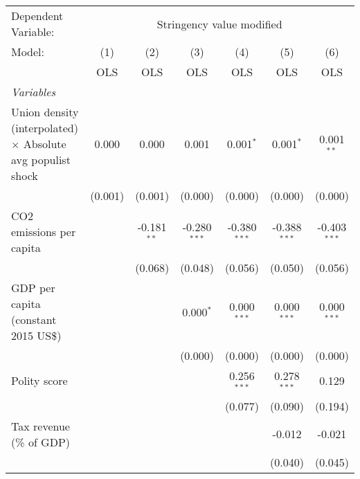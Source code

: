 
\begingroup
\centering
\begin{tabular}{lcccccc}
   \toprule
   Dependent Variable: & \multicolumn{6}{c}{Stringency value modified}\\
   Model:                                                             & (1)     & (2)           & (3)            & (4)            & (5)            & (6)\\  
                                                                      &  OLS    & OLS           & OLS            & OLS            & OLS            & OLS\\  
   \midrule
   \emph{Variables}\\
   Union density (interpolated) $\times$ Absolute avg populist shock  & 0.000   & 0.000         & 0.001          & 0.001$^{*}$    & 0.001$^{*}$    & 0.001$^{**}$\\   
                                                                      & (0.001) & (0.001)       & (0.000)        & (0.000)        & (0.000)        & (0.000)\\   
   CO2 emissions per capita                                           &         & -0.181$^{**}$ & -0.280$^{***}$ & -0.380$^{***}$ & -0.388$^{***}$ & -0.403$^{***}$\\   
                                                                      &         & (0.068)       & (0.048)        & (0.056)        & (0.050)        & (0.056)\\   
   GDP per capita (constant 2015 US\$)                                &         &               & 0.000$^{*}$    & 0.000$^{***}$  & 0.000$^{***}$  & 0.000$^{***}$\\   
                                                                      &         &               & (0.000)        & (0.000)        & (0.000)        & (0.000)\\   
   Polity score                                                       &         &               &                & 0.256$^{***}$  & 0.278$^{***}$  & 0.129\\   
                                                                      &         &               &                & (0.077)        & (0.090)        & (0.194)\\   
   Tax revenue (\% of GDP)                                            &         &               &                &                & -0.012         & -0.021\\   
                                                                      &         &               &                &                & (0.040)        & (0.045)\\   

\end{tabular}
